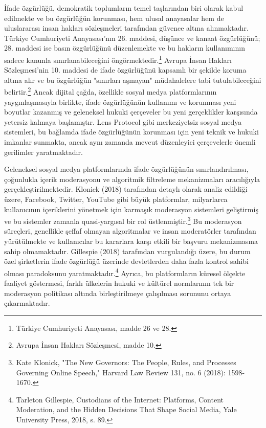\documentclass[11pt,a4paper]{article}
\begin{document}
İfade özgürlüğü, demokratik toplumların temel taşlarından biri olarak kabul edilmekte ve bu özgürlüğün korunması, hem ulusal anayasalar hem de uluslararası insan hakları sözleşmeleri tarafından güvence altına alınmaktadır. Türkiye Cumhuriyeti Anayasası'nın 26. maddesi, düşünce ve kanaat özgürlüğünü; 28. maddesi ise basın özgürlüğünü düzenlemekte ve bu hakların kullanımının sadece kanunla sınırlanabileceğini öngörmektedir.\footnote{Türkiye Cumhuriyeti Anayasası, madde 26 ve 28.} Avrupa İnsan Hakları Sözleşmesi'nin 10. maddesi de ifade özgürlüğünü kapsamlı bir şekilde koruma altına alır ve bu özgürlüğün "sınırları aşmayan" müdahalelere tabi tutulabileceğini belirtir.\footnote{Avrupa İnsan Hakları Sözleşmesi, madde 10.} Ancak dijital çağda, özellikle sosyal medya platformlarının yaygınlaşmasıyla birlikte, ifade özgürlüğünün kullanımı ve korunması yeni boyutlar kazanmış ve geleneksel hukuki çerçeveler bu yeni gerçeklikler karşısında yetersiz kalmaya başlamıştır. Lens Protocol gibi merkeziyetsiz sosyal medya sistemleri, bu bağlamda ifade özgürlüğünün korunması için yeni teknik ve hukuki imkanlar sunmakta, ancak aynı zamanda mevcut düzenleyici çerçevelerle önemli gerilimler yaratmaktadır.

Geleneksel sosyal medya platformlarında ifade özgürlüğünün sınırlandırılması, çoğunlukla içerik moderasyonu ve algoritmik filtreleme mekanizmaları aracılığıyla gerçekleştirilmektedir. Klonick (2018) tarafından detaylı olarak analiz edildiği üzere, Facebook, Twitter, YouTube gibi büyük platformlar, milyarlarca kullanıcının içeriklerini yönetmek için karmaşık moderasyon sistemleri geliştirmiş ve bu sistemler zamanla quasi-yargısal bir rol üstlenmiştir.\footnote{Kate Klonick, "The New Governors: The People, Rules, and Processes Governing Online Speech," Harvard Law Review 131, no. 6 (2018): 1598-1670.} Bu moderasyon süreçleri, genellikle şeffaf olmayan algoritmalar ve insan moderatörler tarafından yürütülmekte ve kullanıcılar bu kararlara karşı etkili bir başvuru mekanizmasına sahip olmamaktadır. Gillespie (2018) tarafından vurgulandığı üzere, bu durum özel şirketlerin ifade özgürlüğü üzerinde devletlerden daha fazla kontrol sahibi olması paradoksunu yaratmaktadır.\footnote{Tarleton Gillespie, Custodians of the Internet: Platforms, Content Moderation, and the Hidden Decisions That Shape Social Media, Yale University Press, 2018, s. 89.} Ayrıca, bu platformların küresel ölçekte faaliyet göstermesi, farklı ülkelerin hukuki ve kültürel normlarının tek bir moderasyon politikası altında birleştirilmeye çalışılması sorununu ortaya çıkarmaktadır.
\end{document}
